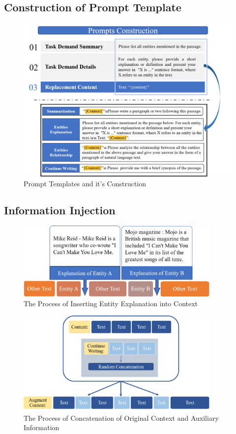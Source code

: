 \documentclass[a4paper,fleqn]{cas-dc}
\newcommand{\1}[1]{\mathds{1}\left[#1\right]}
\begin{document}
\subsection{Construction of Prompt Template}
\label{sec:prompt_construction}
	\begin{figure}[h]
		\centering
		\includegraphics[width=14.5cm]{Prompts_construction.png}
		\caption{Prompt Templates and it's Construction}
		\label{fig:prompt_template}
	\end{figure}   
	
\subsection{Information Injection}
\label{sec:information_injection}
\begin{figure}[h]
	\centering
	\includegraphics[width=10cm]{EntityInsert.png}
	\caption{The Process of Inserting Entity Explanation into Context}
	\label{fig:entity_insertion}
\end{figure}   

\begin{figure}[h]
	\centering
	\includegraphics[width=10cm]{RandomConcat.png}
	\caption{The Process of Concatenation of Original Context and Auxiliary Information}
	\label{fig:random_concatenate}
\end{figure}  
\end{document}
